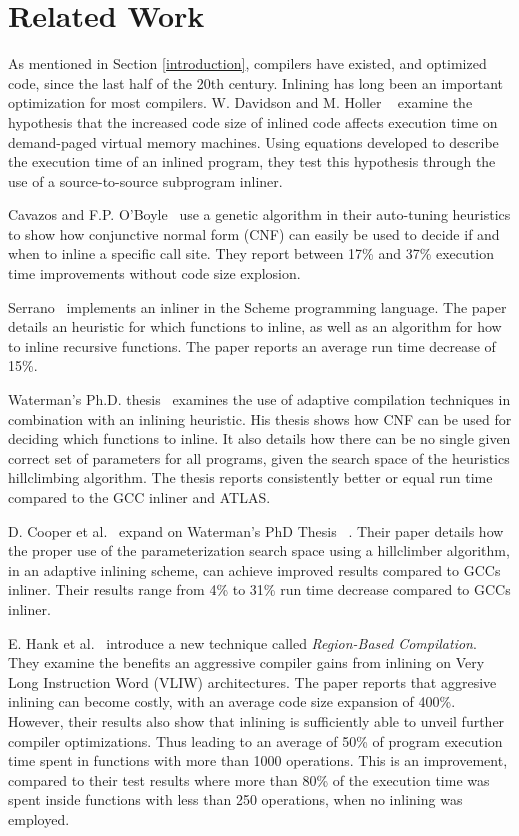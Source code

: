 
\clearpage
\section{Related Work}
\label{sec:related_work}

As mentioned in Section \ref{introduction}, compilers have existed, and
optimized code, since the last half of the 20th century. Inlining has long been
an important optimization for most compilers. W. Davidson and M. Holler
~\cite{SubprogInlining} examine the hypothesis that the increased code size of
inlined code affects execution time on demand-paged virtual memory machines.
Using equations developed to describe the execution time of an inlined program,
they test this hypothesis through the use of a source-to-source subprogram
inliner.

Cavazos and F.P. O'Boyle~\cite{AutoTuningJavaHeuristics} use a genetic algorithm
in their auto-tuning heuristics to show how conjunctive normal form (CNF) can
easily be used to decide if and when to inline a specific call site. They report
between 17\% and 37\% execution time improvements without code size explosion.

Serrano~\cite{InlineWhenHowSerrano} implements an inliner in the Scheme
programming language. The paper details an heuristic for which functions to
inline, as well as an algorithm for how to inline recursive functions. The paper
reports an average run time decrease of 15\%.

Waterman's Ph.D. thesis~\cite{AdaptvCompilAndInlingWaterman} examines the use of
adaptive compilation techniques in combination with an inlining heuristic. His
thesis shows how CNF can be used for deciding which functions to inline. It also
details how there can be no single given correct set of parameters for all
programs, given the search space of the heuristics hillclimbing algorithm. The
thesis reports consistently better or equal run time compared to the GCC inliner
and ATLAS.

D. Cooper et al.~\cite{AdaptvStratInlSubst} expand on Waterman's PhD Thesis
~\cite{AdaptvCompilAndInlingWaterman}. Their paper details how the proper use of
the parameterization search space using a hillclimber algorithm, in an adaptive
inlining scheme, can achieve improved results compared to GCCs inliner. Their
results range from 4\% to 31\% run time decrease compared to GCCs inliner.

E. Hank et al.~\cite{RegionBasedCompilationIntroduction} introduce a new
technique called \textit{Region-Based Compilation}. They examine the benefits an
aggressive compiler gains from inlining on Very Long Instruction Word (VLIW)
architectures. The paper reports that aggresive inlining can become costly, with
an average code size expansion of 400\%. However, their results also show that
inlining is sufficiently able to unveil further compiler optimizations. Thus
leading to an average of 50\% of program execution time spent in functions with
more than 1000 operations. This is an improvement, compared to their test
results where more than 80\% of the execution time was spent inside functions
with less than 250 operations, when no inlining was employed.

